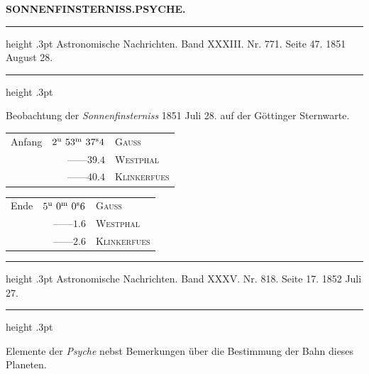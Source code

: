 \clearpage
\thispagestyle{empty}
\noindent{}%
\makebox[12mm][l]{}%
\parbox[t]{\dimexpr\linewidth-24mm\relax}{\centering\footnotesize\bfseries SONNENFINSTERNISS.\enspace PSYCHE.\par}%
\par\nobreak\medskip
\begin{center}
\parbox{.81\linewidth}{%
\centering\small
\hrule height .3pt\relax\vspace{2.5pt}
Astronomische Nachrichten. Band XXXIII. Nr. 771. Seite 47. 1851 August 28.\par
\vspace{2.5pt}\hrule height .3pt\relax
}
\end{center}
\begin{center}Beobachtung der \emph{Sonnenfinsterniss} 1851 Juli 28. auf der Göttinger Sternwarte.\end{center}

\begin{center}
\begin{tabular}{lrl}
Anfang & $2^{\rm u}\ 53^{\rm m}\ 37^{\rm s}4$ & \textsc{Gauss} \\
 & \mbox{---\quad---}\quad $39.4$ & \textsc{Westphal} \\
 & \mbox{---\quad---}\quad $40.4$ & \textsc{Klinkerfues} \\
\end{tabular}
\end{center}
\begin{center}
\begin{tabular}{lrl}
Ende & $5^{\rm u}\ 0^{\rm m}\ 0^{\rm s}6$ & \textsc{Gauss} \\
 & \mbox{---\quad---}\quad $1.6$ & \textsc{Westphal} \\
 & \mbox{---\quad---}\quad $2.6$ & \textsc{Klinkerfues} \\
\end{tabular}
\end{center}

\par\bigskip
{}
\hypertarget{native-484-psyche}{}
\begin{center}
\parbox{.83\linewidth}{%
\centering\small
\hrule height .3pt\relax\vspace{2.5pt}
Astronomische Nachrichten. Band XXXV. Nr. 818. Seite 17. 1852 Juli 27.\par
\vspace{2.5pt}\hrule height .3pt\relax
}
\end{center}
\begin{center}Elemente der \emph{Psyche} nebst Bemerkungen über die Bestimmung der Bahn dieses Planeten.\end{center}

